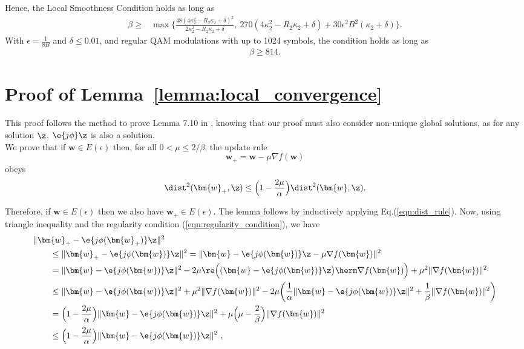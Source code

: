 Hence, the Local Smoothness Condition holds as long as
\begin{align}
\beta\geq&\max\Big\{\frac{48(4\kappa_2^2-R_2\kappa_2+\delta)^2}{2\kappa_2^2-R_2\kappa_2+\delta},\ 270(4\kappa_2^2-R_2\kappa_2+\delta)+30\epsilon^2B^2(\kappa_2+\delta)\Big\}.
\end{align}
With $\epsilon=\frac{1}{8B}$ and $\delta\leq0.01$, and regular QAM modulations with up to 1024 symbols, the condition holds as long as
\begin{align}
\beta\geq814.
\end{align}

\section{Proof of Lemma~\ref{lemma:local_convergence}}\label{appdx:local_convergence}
This proof follows the method to prove Lemma 7.10 in \cite{Candes2015a_phaseretrievalWF}, knowing that our proof must also consider non-unique global solutions, as for any solution $\z$, $\e{j\phi}\z$ is also a solution.\\
We prove that if $\bm{w} \in E(\epsilon)$ then, for all $0 < \mu \leq 2/\beta$, the update rule
\begin{equation}
\bm{w}_+ = \bm{w} - \mu\nabla f(\bm{w})
\end{equation}
obeys
\begin{equation}
\dist^2(\bm{w}_+,\z)\leq \Big(1 - \frac{2\mu}{\alpha}\Big)\dist^2(\bm{w},\z). \label{eqn:dist_rule}
\end{equation}

Therefore, if $\bm{w} \in E(\epsilon)$ then we also have $\bm{w}_+ \in E(\epsilon)$. The lemma follows by inductively applying Eq.(\ref{eqn:dist_rule}). Now, using triangle inequality and the regularity condition (\ref{eqn:regularity_condition}), we have
\begin{align}
&\|\bm{w}_+-\e{j\phi(\bm{w}_+)}\z\|^2\nonumber\\
&\qquad\leq\|\bm{w}_+-\e{j\phi(\bm{w})}\z\|^2\nonumber=\|\bm{w}-\e{j\phi(\bm{w})}\z-\mu\nabla f(\bm{w})\|^2\nonumber\\
&\qquad=\|\bm{w}-\e{j\phi(\bm{w})}\z\|^2-2\mu\re\Big((\bm{w}-\e{j\phi(\bm{w})}\z\big)\herm\nabla f(\bm{w})\Big) +\mu^2\|\nabla f(\bm{w})\|^2\nonumber\\
&\qquad\leq\|\bm{w}-\e{j\phi(\bm{w})}\z\|^2 +\mu^2\|\nabla f(\bm{w})\|^2-2\mu\bigg(\frac{1}{\alpha}\|\bm{w}-\e{j\phi(\bm{w})}\z\|^2+\frac{1}{\beta}\|\nabla f(\bm{w})\|^2\bigg)\nonumber\\
&\qquad=\Big(1-\frac{2\mu}{\alpha}\Big)\|\bm{w}-\e{j\phi(\bm{w})}\z\|^2+\mu\Big(\mu-\frac{2}{\beta}\Big)\|\nabla f(\bm{w})\|^2\nonumber\\
&\qquad\leq\Big(1-\frac{2\mu}{\alpha}\Big)\|\bm{w}-\e{j\phi(\bm{w})}\z\|^2\,\,,
\end{align}

